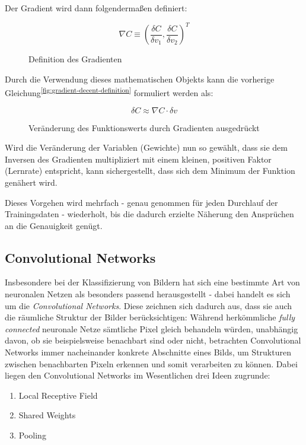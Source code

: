 Der Gradient wird dann folgendermaßen definiert:

\begin{figure}[h]
    \centering
    \[ \nabla C \equiv
        (\frac{\delta C}{\delta v_1},\frac{\delta C}{\delta v_2})^T
    \]
    \caption{Definition des Gradienten}
    \label{fig:gradient-decent-definition-2}
\end{figure}

Durch die Verwendung dieses mathematischen Objekts kann die vorherige Gleichung\textsuperscript{\ref{fig:gradient-decent-definition}} formuliert werden als:

\begin{figure}[h]
    \centering
    \[ \delta C \approx
        \nabla C \cdot \delta v
    \]
    \caption{Veränderung des Funktionswerts durch Gradienten ausgedrückt}
    \label{fig:gradient-decent-definition-3}
\end{figure}

Wird die Veränderung der Variablen (Gewichte) nun so gewählt, dass sie dem Inversen des Gradienten multipliziert mit
einem kleinen, positiven Faktor (Lernrate) entspricht, kann sichergestellt, dass sich dem Minimum der Funktion
genähert wird.

Dieses Vorgehen wird mehrfach - genau genommen für jeden Durchlauf der Trainingsdaten - wiederholt, bis die dadurch erzielte Näherung den
Ansprüchen an die Genauigkeit genügt.

\subsection{Convolutional Networks}

Insbesondere bei der Klassifizierung von Bildern hat sich eine bestimmte Art von neuronalen Netzen als besonders passend
herausgestellt - dabei handelt es sich um die \textit{Convolutional Networks}. Diese zeichnen sich dadurch aus,
dass sie auch die räumliche Struktur der Bilder berücksichtigen: Während herkömmliche \textit{fully connected} neuronale Netze
sämtliche Pixel gleich behandeln würden, unabhängig davon, ob sie beispielsweise benachbart sind oder nicht, betrachten
Convolutional Networks immer nacheinander konkrete Abschnitte eines Bilds, um Strukturen zwischen benachbarten Pixeln
erkennen und somit verarbeiten zu können.
Dabei liegen den Convolutional Networks im Wesentlichen drei Ideen zugrunde:

\begin{enumerate}
    \item{Local Receptive Field}
    \item{Shared Weights}
    \item{Pooling}
\end{enumerate}

